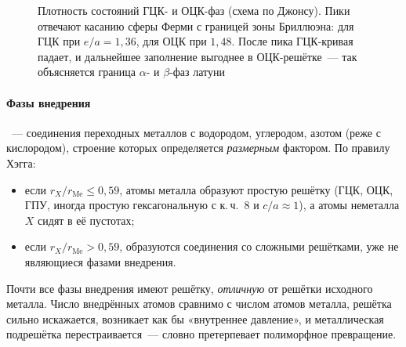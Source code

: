 \begin{figure}[ht]
\centering
{}
\caption{Плотность состояний ГЦК- и ОЦК-фаз (схема по Джонсу). Пики
отвечают касанию сферы Ферми с границей зоны Бриллюэна: для ГЦК при
$e/a=1{,}36$, для ОЦК при $1{,}48$. После пика ГЦК-кривая падает, и
дальнейшее заполнение выгоднее в ОЦК-решётке~— так объясняется граница
$\alpha$- и $\beta$-фаз латуни}
\label{fig:jones}
\end{figure}

\paragraph{Фазы внедрения}
~— соединения переходных металлов с водородом,
углеродом, азотом (реже с кислородом), строение которых определяется
\emph{размерным} фактором. По правилу Хэгга:
\begin{itemize}
\item если $r_X/r_\text{Me}\le0{,}59$, атомы металла образуют
простую решётку (ГЦК, ОЦК, ГПУ, иногда простую гексагональную с
к.\,ч.~8 и $c/a\approx1$), а атомы неметалла $X$ сидят в её пустотах;
\item если $r_X/r_\text{Me}>0{,}59$, образуются соединения со сложными
решётками, уже не являющиеся фазами внедрения.
\end{itemize}

Почти все фазы внедрения имеют решётку, \emph{отличную} от решётки
исходного металла. Число внедрённых атомов сравнимо с числом атомов
металла, решётка сильно искажается, возникает как бы «внутреннее
давление», и металлическая подрешётка перестраивается~— словно
претерпевает полиморфное превращение.

